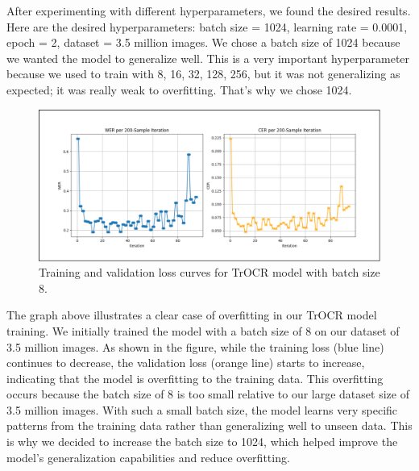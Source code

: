 After experimenting with different hyperparameters, we found the desired results. Here are the 
desired hyperparameters: batch size = 1024, learning rate = 0.0001, epoch = 2, dataset = 3.5 
million images. We chose a batch size of 1024 because we wanted the model to generalize well. 
This is a very important hyperparameter because we used to train with 8, 16, 32, 128, 256, 
but it was not generalizing as expected; it was really weak to overfitting. That's why we 
chose 1024.



\begin{figure}[H]
    \centering
    \includegraphics[width=\textwidth]{figures/trocr_overfitting_v1.png}
    \caption{Training and validation loss curves for TrOCR model with batch size 8.}
    \label{fig:trocr-overfitting}
\end{figure}

The graph above illustrates a clear case of overfitting in our TrOCR model training. 
We initially trained the model with a batch size of 8 on our dataset of 3.5 million images. 
As shown in the figure, while the training loss (blue line) continues to decrease, 
the validation loss (orange line) starts to increase, indicating that the model is overfitting 
to the training data. This overfitting occurs because the batch size of 8 is too small relative 
to our large dataset size of 3.5 million images. With such a small batch size, the model learns 
very specific patterns from the training data rather than generalizing well to unseen data. 
This is why we decided to increase the batch size to 1024, which helped improve the model's 
generalization capabilities and reduce overfitting.


